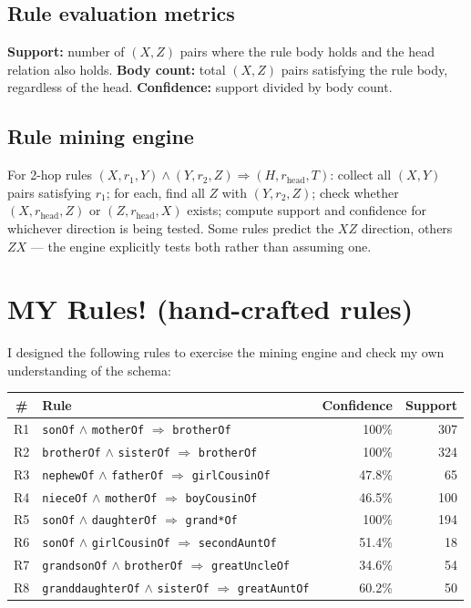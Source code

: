 \documentclass[11pt,a4paper]{article}
\newcommand{\rel}[1]{\texttt{\small #1}}
\begin{document}
\subsection{Rule evaluation metrics}

\textbf{Support:} number of $(X,Z)$ pairs where the rule body holds and
the head relation also holds. \textbf{Body count:} total $(X,Z)$ pairs
satisfying the rule body, regardless of the head. \textbf{Confidence:}
support divided by body count.

\subsection{Rule mining engine}

For 2-hop rules $(X, r_1, Y) \wedge (Y, r_2, Z) \Rightarrow (H, r_{\text{head}}, T)$:
collect all $(X,Y)$ pairs satisfying $r_1$; for each, find all $Z$ with
$(Y, r_2, Z)$; check whether $(X, r_{\text{head}}, Z)$ or
$(Z, r_{\text{head}}, X)$ exists; compute support and confidence for
whichever direction is being tested. Some rules predict the $XZ$
direction, others $ZX$ --- the engine explicitly tests both rather than
assuming one.

\section{MY Rules! (hand-crafted rules)}

I designed the following rules to exercise the mining engine and check my
own understanding of the schema:

\begin{center}
\begin{tabular}{clrr}
\toprule
\textbf{\#} & \textbf{Rule} & \textbf{Confidence} & \textbf{Support} \\
\midrule
R1 & \rel{sonOf} $\wedge$ \rel{motherOf} $\Rightarrow$ \rel{brotherOf} & 100\% & 307 \\
R2 & \rel{brotherOf} $\wedge$ \rel{sisterOf} $\Rightarrow$ \rel{brotherOf} & 100\% & 324 \\
R3 & \rel{nephewOf} $\wedge$ \rel{fatherOf} $\Rightarrow$ \rel{girlCousinOf} & 47.8\% & 65 \\
R4 & \rel{nieceOf} $\wedge$ \rel{motherOf} $\Rightarrow$ \rel{boyCousinOf} & 46.5\% & 100 \\
R5 & \rel{sonOf} $\wedge$ \rel{daughterOf} $\Rightarrow$ \rel{grand*Of} & 100\% & 194 \\
R6 & \rel{sonOf} $\wedge$ \rel{girlCousinOf} $\Rightarrow$ \rel{secondAuntOf} & 51.4\% & 18 \\
R7 & \rel{grandsonOf} $\wedge$ \rel{brotherOf} $\Rightarrow$ \rel{greatUncleOf} & 34.6\% & 54 \\
R8 & \rel{granddaughterOf} $\wedge$ \rel{sisterOf} $\Rightarrow$ \rel{greatAuntOf} & 60.2\% & 50 \\
\bottomrule
\end{tabular}
\end{center}
\end{document}
